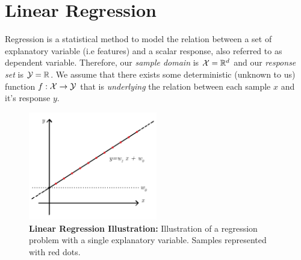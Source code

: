 \chapter{Linear Regression}
\label{chp:lin_reg}
Regression is a statistical method to model the relation between a set of explanatory variable (i.e features) and a scalar response, also referred to as dependent variable. Therefore, our \textit{sample domain} is $\mathcal{X}=\mathbb{R}^d$ and our \textit{response set} is $\mathcal{Y}=\mathbb{R}$. We assume that there exists some deterministic (unknown to us) function $f:\mathcal{X}\rightarrow\mathcal{Y}$ that is \textit{underlying} the relation between each sample $x$ and it's response $y$.

\begin{figure}[!h]
	\centering
	\includegraphics[width=0.5\textwidth]{chapters/intro.regression/figures/2_1.png}
	\caption{\textbf{Linear Regression Illustration:} Illustration of a regression problem with a single explanatory variable. Samples represented with red dots.}
\end{figure}

